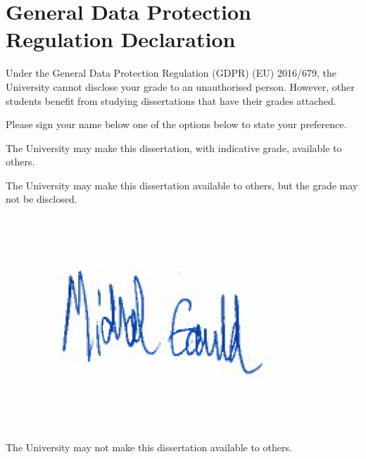 
\section*{General Data Protection Regulation Declaration}
\vspace{0.5cm}
\begin{flushleft}
Under the General Data Protection Regulation (GDPR) (EU) 2016/679, the University cannot disclose your grade to an unauthorised person. However, other students benefit from studying dissertations that have their grades attached. \newline

\vspace{0.5cm}

Please sign your name below one of the options below to state your preference.\newline
\vspace{0.5cm}

The University may make this dissertation, with indicative grade, available to others.\newline
\vspace{3cm}


The University may make this dissertation available to others, but the grade may not be disclosed.\newline

\includegraphics[scale=0.25]{Report/graphics/sig.png}
\vspace{1cm}


The University may not make this dissertation available to others.\newline
\end{flushleft}


